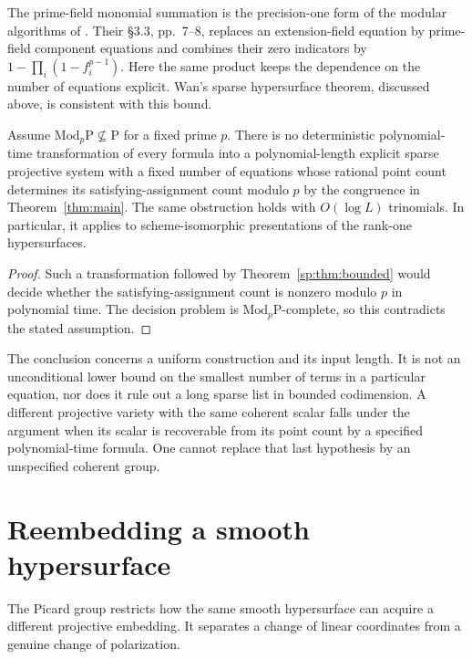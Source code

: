 The prime-field monomial summation is the precision-one form of the
modular algorithms of \citet[\S3.1, pp.~5--6]{sp-ggl}.
Their \S3.3, pp.~7--8, replaces an extension-field equation by
prime-field component equations and combines their zero indicators by
$1-\prod_i(1-f_i^{p-1})$. Here the same product keeps the dependence on
the number of equations explicit. Wan's sparse hypersurface theorem,
discussed above, is consistent with this bound.

\begin{corollary}
\label{sp:cor:compression}
Assume $\mathrm{Mod}_p\mathrm P\not\subseteq\mathrm P$ for a fixed prime
$p$. There is no deterministic polynomial-time transformation of every
formula into a polynomial-length explicit sparse projective system with
a fixed number of equations whose rational point count determines its
satisfying-assignment count modulo $p$ by the congruence in
Theorem~\ref{thm:main}. The same obstruction holds with
$O(\log L)$ trinomials. In particular, it applies to scheme-isomorphic
presentations of the rank-one hypersurfaces.
\end{corollary}
\begin{proof}
Such a transformation followed by Theorem~\ref{sp:thm:bounded} would
decide whether the satisfying-assignment count is nonzero modulo $p$
in polynomial time. The decision problem is
$\mathrm{Mod}_p\mathrm P$-complete, so this contradicts the stated
assumption.
\end{proof}

The conclusion concerns a uniform construction and its input length.
It is not an unconditional lower bound on the smallest number of terms
in a particular equation, nor does it rule out a long sparse list in
bounded codimension. A different projective variety with the same
coherent scalar falls under the argument when its scalar is recoverable
from its point count by a specified polynomial-time formula. One cannot
replace that last hypothesis by an unspecified coherent group.

\section{Reembedding a smooth hypersurface}
\label{sp:sec:reembedding}
The Picard group restricts how the same smooth hypersurface can acquire
a different projective embedding. It separates a change of linear
coordinates from a genuine change of polarization.

